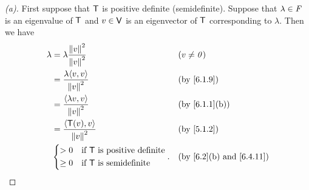 \begin{proof}[(a)]
  First suppose that \(\mathsf{T}\) is positive definite (semidefinite).
  Suppose that \(\lambda \in \mathit{F}\) is an eigenvalue of \(\mathsf{T}\) and \(v \in \mathsf{V}\) is an eigenvector of \(\mathsf{T}\) corresponding to \(\lambda\).
  Then we have
  \begin{align*}
    \lambda & = \lambda \frac{\norm{v}^2}{\norm{v}^2}                &  & (v \neq \zv)                \\
            & = \frac{\lambda \inn{v, v}}{\norm{v}^2}                &  & \text{(by \cref{6.1.9})}    \\
            & = \frac{\inn{\lambda v, v}}{\norm{v}^2}                &  & \text{(by \cref{6.1.1}(b))} \\
            & = \frac{\inn{\T(v), v}}{\norm{v}^2}                    &  & \text{(by \cref{5.1.2})}    \\
            & \begin{dcases}
                > 0    & \text{if } \T \text{ is positive definite} \\
                \geq 0 & \text{if } \T \text{ is semidefinite}
              \end{dcases}. &  & \text{(by \cref{6.2}(b) and \cref{6.4.11})}
  \end{align*}


\end{proof}

